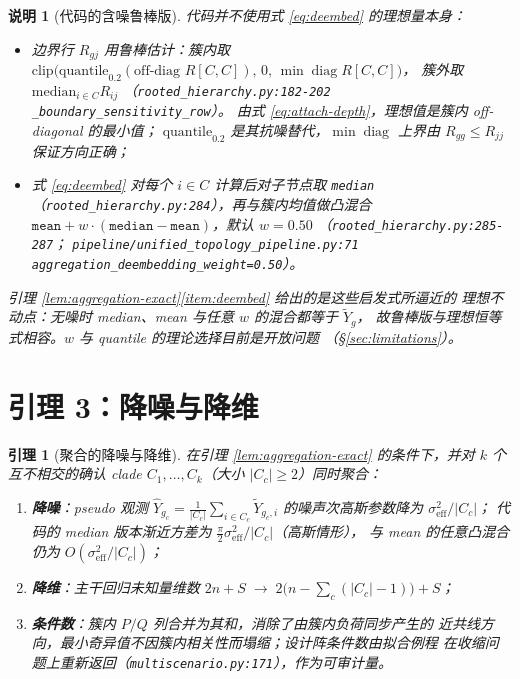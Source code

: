 \documentclass[UTF8,11pt]{ctexart}
\newtheorem{lemma}{引理}
\newtheorem{remark}{说明}
\begin{document}
\begin{remark}[代码的含噪鲁棒版]
代码并不使用式 \eqref{eq:deembed} 的理想量本身：
\begin{itemize}[leftmargin=2em]
  \item 边界行 $R_{gj}$ 用鲁棒估计：簇内取
        $\mathrm{clip}\bigl(\mathrm{quantile}_{0.2}(\text{off-diag }R[C,C]),\,0,\,\min\operatorname{diag}R[C,C]\bigr)$，
        簇外取 $\mathrm{median}_{i\in C}R_{ij}$
        （\texttt{rooted\_hierarchy.py:182-202} \texttt{\_boundary\_sensitivity\_row}）。
        由式 \eqref{eq:attach-depth}，理想值是簇内 off-diagonal 的\emph{最小值}；
        $\mathrm{quantile}_{0.2}$ 是其抗噪替代，$\min\operatorname{diag}$ 上界由
        $R_{gg}\le R_{jj}$ 保证方向正确；
  \item 式 \eqref{eq:deembed} 对每个 $i\in C$ 计算后对子节点取 \texttt{median}
        （\texttt{rooted\_hierarchy.py:284}），再与簇内均值做凸混合
        $\texttt{mean}+w\cdot(\texttt{median}-\texttt{mean})$，默认 $w=0.50$
        （\texttt{rooted\_hierarchy.py:285-287}；
        \texttt{pipeline/unified\_topology\_pipeline.py:71}
        \texttt{aggregation\_deembedding\_weight=0.50}）。
\end{itemize}
引理 \ref{lem:aggregation-exact}\ref{item:deembed} 给出的是这些启发式所逼近的
\emph{理想不动点}：无噪时 median、mean 与任意 $w$ 的混合都等于 $\widetilde Y_g$，
故鲁棒版与理想恒等式相容。$w$ 与 quantile 的理论选择目前是开放问题
（\S\ref{sec:limitations}）。
\end{remark}

\section{引理 3：降噪与降维}
\label{sec:denoise}

\begin{lemma}[聚合的降噪与降维]
\label{lem:denoise}
在引理 \ref{lem:aggregation-exact} 的条件下，并对 $k$ 个互不相交的确认 clade
$C_1,\ldots,C_k$（大小 $|C_c|\ge 2$）同时聚合：
\begin{enumerate}[label=\textup{(\alph*)},leftmargin=2.4em]
  \item \textbf{降噪}：pseudo 观测
        $\widehat Y_{g_c}=\frac{1}{|C_c|}\sum_{i\in C_c}\widetilde Y_{g_c,i}$
        的噪声次高斯参数降为 $\sigma_{\mathrm{eff}}^2/|C_c|$；
        代码的 median 版本渐近方差为
        $\frac{\pi}{2}\sigma_{\mathrm{eff}}^2/|C_c|$（高斯情形），
        与 mean 的任意凸混合仍为 $O(\sigma_{\mathrm{eff}}^2/|C_c|)$；
  \item \textbf{降维}：主干回归未知量维数
        $2n+S\;\longrightarrow\;2\bigl(n-\textstyle\sum_c(|C_c|-1)\bigr)+S$；
  \item \textbf{条件数}：簇内 $P/Q$ 列合并为其和，消除了由簇内负荷同步产生的
        近共线方向，最小奇异值不因簇内相关性而塌缩；设计阵条件数由拟合例程
        在收缩问题上重新返回（\texttt{multiscenario.py:171}），作为可审计量。
\end{enumerate}
\end{lemma}
\end{document}
